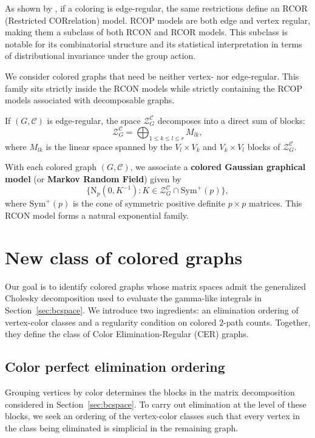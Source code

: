 \documentclass[12pt]{amsart}
\theoremstyle{plain}
\theoremstyle{definition}
\theoremstyle{remark}
\newcommand{\1}{\mathbf{1}}
\newcommand{\coloredZ}{\mathcal{Z}_{G}^{\mathcal{C}}}
\begin{document}
As shown by \citet{GeLau2012}, if a coloring is edge-regular, the same restrictions define an RCOR (Restricted CORrelation) model. RCOP models are both edge and vertex regular, making them a subclass of both RCON and RCOR models. This subclass is notable for its combinatorial structure and its statistical interpretation in terms of distributional invariance under the group action.


We consider colored graphs that need be neither vertex- nor edge-regular. This family sits strictly inside the RCON models while strictly containing the RCOP models associated with decomposable graphs.

 If $(G,\mathcal{C})$ is edge-regular, the space $\coloredZ$ decomposes into a direct sum of blocks:
    \[
\coloredZ= \bigoplus_{1\leq k\leq l \leq r} M_{lk},
    \]
where $M_{lk}$ is the linear space spanned by the $V_l\times V_k$ and $V_k\times V_l$ blocks of $\mathcal{Z}_G^{\mathcal{C}}$. 

With each colored graph $(G,\mathcal{C})$, we associate a \textbf{colored Gaussian graphical model} (or \textbf{Markov Random Field}) given by
\[
\{ \mathrm{N}_p(0,K^{-1})\colon K\in \coloredZ\cap\mathrm{Sym}^+(p)\},
\]
where $\mathrm{Sym}^+(p)$ is the cone of symmetric positive definite $p\times p$ matrices.
This RCON model forms a natural exponential family.


\section{New class of colored graphs}\label{sec:newclass}

Our goal is to identify colored graphs whose matrix spaces admit the generalized Cholesky decomposition used to evaluate the gamma-like integrals in Section~\ref{sec:bcspace}. We introduce two ingredients: an elimination ordering of vertex-color classes and a regularity condition on colored $2$-path counts. Together, they define the class of Color Elimination-Regular (CER) graphs.

\subsection{Color perfect elimination ordering}\label{sec:cpeo}

Grouping vertices by color determines the blocks in the matrix decomposition considered in Section~\ref{sec:bcspace}. To carry out elimination at the level of these blocks, we seek an ordering of the vertex-color classes such that every vertex in the class being eliminated is simplicial in the remaining graph.
\end{document}
